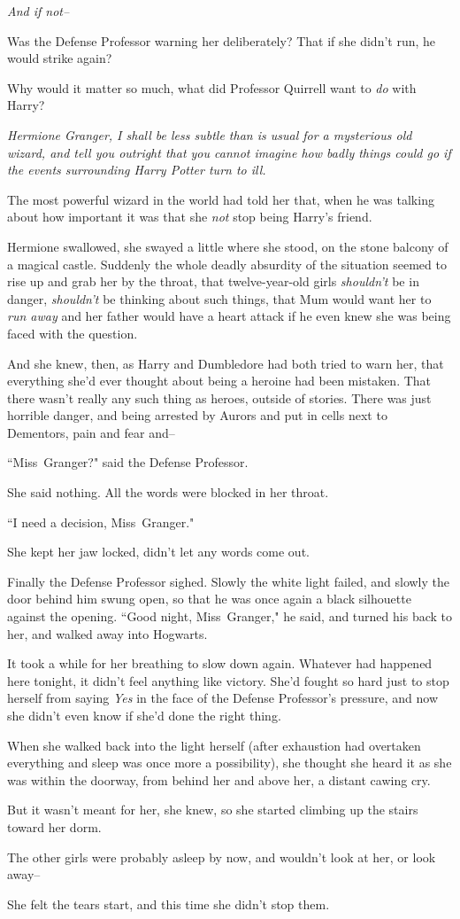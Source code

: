 \emph{And if not\---}

Was the Defense Professor warning her deliberately? That if she didn't run, he would strike again?

Why would it matter so much, what did Professor Quirrell want to \emph{do} with Harry?

\emph{Hermione Granger, I shall be less subtle than is usual for a mysterious old wizard, and tell you outright that you cannot \emph{imagine} how badly things could go if the events surrounding Harry Potter turn to ill.}

The most powerful wizard in the world had told her that, when he was talking about how important it was that she \emph{not} stop being Harry's friend.

Hermione swallowed, she swayed a little where she stood, on the stone balcony of a magical castle. Suddenly the whole deadly absurdity of the situation seemed to rise up and grab her by the throat, that twelve-year-old girls \emph{shouldn't} be in danger, \emph{shouldn't} be thinking about such things, that Mum would want her to \emph{run away} and her father would have a heart attack if he even knew she was being faced with the question.

And she knew, then, as Harry and Dumbledore had both tried to warn her, that everything she'd ever thought about being a heroine had been mistaken. That there wasn't really any such thing as heroes, outside of stories. There was just horrible danger, and being arrested by Aurors and put in cells next to Dementors, pain and fear and\---

``Miss~Granger?" said the Defense Professor.

She said nothing. All the words were blocked in her throat.

``I need a decision, Miss~Granger."

She kept her jaw locked, didn't let any words come out.

Finally the Defense Professor sighed. Slowly the white light failed, and slowly the door behind him swung open, so that he was once again a black silhouette against the opening. ``Good night, Miss~Granger," he said, and turned his back to her, and walked away into Hogwarts.

It took a while for her breathing to slow down again. Whatever had happened here tonight, it didn't feel anything like victory. She'd fought so hard just to stop herself from saying \emph{Yes} in the face of the Defense Professor's pressure, and now she didn't even know if she'd done the right thing.

When she walked back into the light herself (after exhaustion had overtaken everything and sleep was once more a possibility), she thought she heard it as she was within the doorway, from behind her and above her, a distant cawing cry.

But it wasn't meant for her, she knew, so she started climbing up the stairs toward her dorm.

The other girls were probably asleep by now, and wouldn't look at her, or look away\---

She felt the tears start, and this time she didn't stop them.

